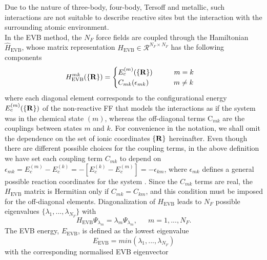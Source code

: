 Due to the nature of three-body, four-body, Tersoff and metallic, such interactions are not suitable to describe reactive sites but the interaction with the surrounding atomic environment.\\
In the EVB method, the $N_F$ force fields are coupled through the Hamiltonian $\hat{H}_{\text{EVB}}$, whose matrix representation $H_{\text{EVB}} \in \mathcal{R}^{N_F \times N_F}$ has the following components
\begin{equation}\label{eq:evbmatrix}
H^{mk}_{\text{EVB}}(\{\bf{R}\})=\begin{cases} E_{c}^{(m)}(\{{\bf R}\})               \,\,\,\,\,\,\,\,\,\,\,\,\,\,\,\,\,\,  m=k   \\
                                                                   C_{mk}(\epsilon_{mk})                     \,\,\,\,\,\,\,\,\,\,\,\,\,\,\,\,\,\,\,\,\,   m \ne k 
                                              \end{cases}
\end{equation}
where each diagonal element corresponds to the configurational energy $E_{c}^{(m)}(\{ {\bf R} \})$ of the non-reactive FF that models the interactions as if the system was in the chemical state $(m)$, whereas the off-diagonal terms C$_{mk}$ are the couplings between states $m$ and $k$. For convenience in the notation, we shall omit the dependence on the set of ionic coordinates $\{{\bf R}\}$ hereinafter. Even though there are different possible choices for the coupling terms, in the above definition we have set each coupling term $C_{mk}$ to depend on $\epsilon_{mk}=E_{c}^{(m)}-E_{c}^{(k)}=-[E_{c}^{(k)}-E_{c}^{(m)}]=-\epsilon_{km}$, where $\epsilon_{mk}$ defines a general possible reaction coordinates for the system \cite{hartke2015,duarte2017,mones2009,warshel1991}. Since the $C_{mk}$ terms are real, the $H_{\text{EVB}}$ matrix is Hermitian only if $C_{mk}=C_{km}$, and this condition must be imposed for the off-diagonal elements. Diagonalization of $H_{\text{EVB}}$ leads to $N_F$ possible eigenvalues $\{\lambda_1,...,\lambda_{N_{F}}\}$ with
\begin{equation}\label{eq:Heig}
 H_{\text{EVB}}\Psi_{\lambda_m}=\lambda_m \Psi_{\lambda_m}, \,\,\,\,\,\,\,\,\, m=1,...,N_F.
\end{equation}
The EVB energy, $E_{\text{EVB}}$, is defined as the lowest eigenvalue
\begin{equation}\label{eq:Eevb}
 E_{\text{EVB}}=min(\lambda_1,...,\lambda_{N_F})
\end{equation}
with the corresponding normalised EVB eigenvector
